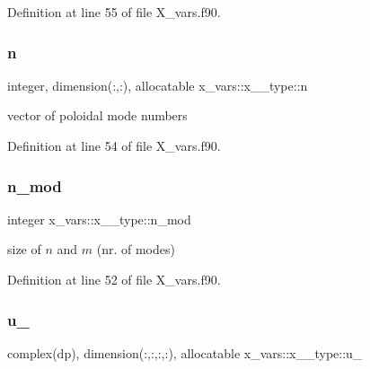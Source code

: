 Definition at line 55 of file X\+\_\+vars.\+f90.

\mbox{\label{structx__vars_1_1x__1__type_aa8357fc77cfb833b7ead7310fe8cdd2a}} 
\subsubsection{\texorpdfstring{n}{n}}
{\footnotesize\ttfamily integer, dimension(\+:,\+:), allocatable x\+\_\+vars\+::x\+\_\+\_\+type\+::n}



vector of poloidal mode numbers 



Definition at line 54 of file X\+\_\+vars.\+f90.

\mbox{\label{structx__vars_1_1x__1__type_a2c6f8950aab84d1c8496d676765e495d}} 
\subsubsection{\texorpdfstring{n\+\_\+mod}{n\_mod}}
{\footnotesize\ttfamily integer x\+\_\+vars\+::x\+\_\+\_\+type\+::n\+\_\+mod}



size of $n$ and $m$ (nr. of modes) 



Definition at line 52 of file X\+\_\+vars.\+f90.

\mbox{\label{structx__vars_1_1x__1__type_a49ba10abb2c45fc9f6faf0412f7af198}} 
\subsubsection{\texorpdfstring{u\+\_}{u\_0}}
{\footnotesize\ttfamily complex(dp), dimension(\+:,\+:,\+:,\+:), allocatable x\+\_\+vars\+::x\+\_\+\_\+type\+::u\+\_}



